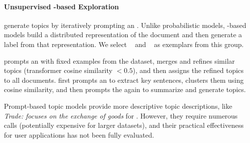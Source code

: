 \paragraph{Unsupervised \mm{}-based Exploration} generate topics by iteratively prompting an \mm{}.
%
Unlike probabilistic models, \mm{}-based models build a distributed
representation of the document and then generate a label from that
representation.
%
We select \topicgpt{}~\cite{pham2024topicgpt} and \lloom{}~\cite{lam2024concept} as exemplars from this group.
%
%

\topicgpt{} prompts an \mm{} with fixed examples from the dataset,
merges and refines similar topics (transformer cosine similarity \(<
0.5\)), and then assigns the refined topics to all documents. \lloom{}
first prompts an \mm{} to extract key sentences, clusters them using
cosine similarity, and then prompts the \mm{} again to summarize and
generate topics.

%
%
%
%
%

%
Prompt-based topic models provide more descriptive topic descriptions,
like \textit{Trade: focuses on the exchange of goods} for
\topicgpt{}. 
%
However, they require numerous \mm{} calls (potentially
expensive for larger datasets), and their practical effectiveness for
user applications has not been fully evaluated.

